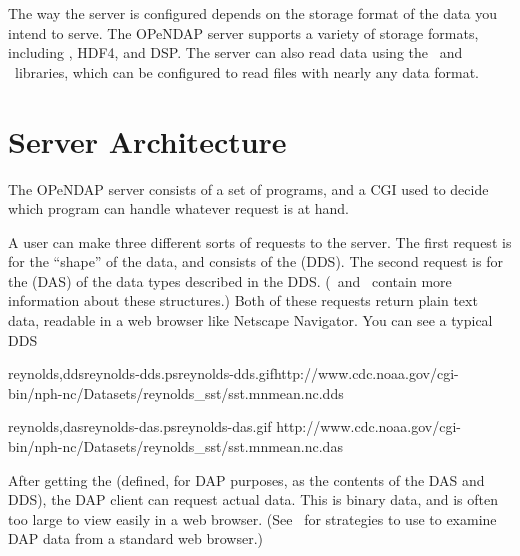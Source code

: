 \documentclass{dods-book}
\begin{document}
The way the server is configured depends on the storage format of the
data you intend to serve. The OPeNDAP server supports a variety of
storage formats, including \netcdf , HDF4, and DSP. The server can
also read data using the \ffnd\ and \jgofs\ libraries, which can be
configured to read files with nearly any data format.

\section{Server Architecture}
\label{dods-server,arch}

The OPeNDAP server consists of a set of programs, and a CGI  used to decide which program can handle whatever request is
at hand.

  A user can make
three different sorts of requests to the server.
The first request is for the ``shape'' of the data, and consists of
the  (DDS).  The second request is for
the  (DAS) of the data types described
in the DDS.  (\DODSquick\ and \DODSuser\ contain more information
about these structures.)  Both of these requests return plain text
data, readable in a web browser like Netscape Navigator.  You can see
a typical DDS 

{reynolds,dds}{reynolds-dds.ps}{reynolds-dds.gif}{http://www.cdc.noaa.gov/cgi-bin/nph-nc/Datasets/reynolds_sst/sst.mnmean.nc.dds}

\T\pagebreak


{reynolds,das}{reynolds-das.ps}{reynolds-das.gif}
{http://www.cdc.noaa.gov/cgi-bin/nph-nc/Datasets/reynolds_sst/sst.mnmean.nc.das}

After getting the  (defined, for DAP purposes, as the
contents of the DAS and DDS), the DAP client can request actual data.  This
is binary data, and is often too large to view easily in a web
browser.  (See \DODSquick\ for strategies to use to examine DAP data
from a standard web browser.)
\end{document}
